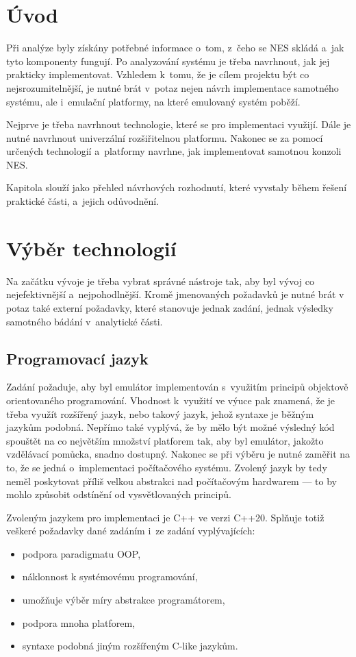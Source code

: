 \section{Úvod}
Při analýze byly získány potřebné informace o~tom, z~čeho se NES skládá a~jak tyto komponenty fungují. Po analyzování systému je třeba navrhnout, jak jej prakticky implementovat. Vzhledem k~tomu, že je cílem projektu být co nejsrozumitelnější, je nutné brát v~potaz nejen návrh implementace samotného systému, ale i~emulační platformy, na které emulovaný systém poběží.

Nejprve je třeba navrhnout technologie, které se pro implementaci využijí. Dále je nutné navrhnout univerzální rozšiřitelnou platformu. Nakonec se za pomocí určených technologií a~platformy navrhne, jak implementovat samotnou konzoli NES.

Kapitola slouží jako přehled návrhových rozhodnutí, které vyvstaly během řešení praktické části, a~jejich odůvodnění.

\section{Výběr technologií}
Na začátku vývoje je třeba vybrat správné nástroje tak, aby byl vývoj co nejefektivnější a~nejpohodlnější. Kromě jmenovaných požadavků je nutné brát v potaz také externí požadavky, které stanovuje jednak zadání, jednak výsledky samotného bádání v~analytické části.

\subsection{Programovací jazyk}
Zadání požaduje, aby byl emulátor implementován s~využitím principů objektově orientovaného programování. Vhodnost k~využití ve výuce pak znamená, že je třeba využít rozšířený jazyk, nebo takový jazyk, jehož syntaxe je běžným jazykům podobná. Nepřímo také vyplývá, že by mělo být možné výsledný kód spouštět na co největším množství platforem tak, aby byl emulátor, jakožto vzdělávací pomůcka, snadno dostupný. Nakonec se při výběru je nutné zaměřit na to, že se jedná o~implementaci počítačového systému. Zvolený jazyk by tedy neměl poskytovat příliš velkou abstrakci nad počítačovým hardwarem --- to by mohlo způsobit odstínění od vysvětlovaných principů.

Zvoleným jazykem pro implementaci je C++ ve verzi C++20. Splňuje totiž veškeré požadavky dané zadáním i~ze zadání vyplývajících:
\begin{itemize}
	\item podpora paradigmatu OOP,
	\item náklonnost k systémovému programování,
	\item umožňuje výběr míry abstrakce programátorem,
	\item podpora mnoha platforem,
	\item syntaxe podobná jiným rozšířeným C-like jazykům.
\end{itemize}

